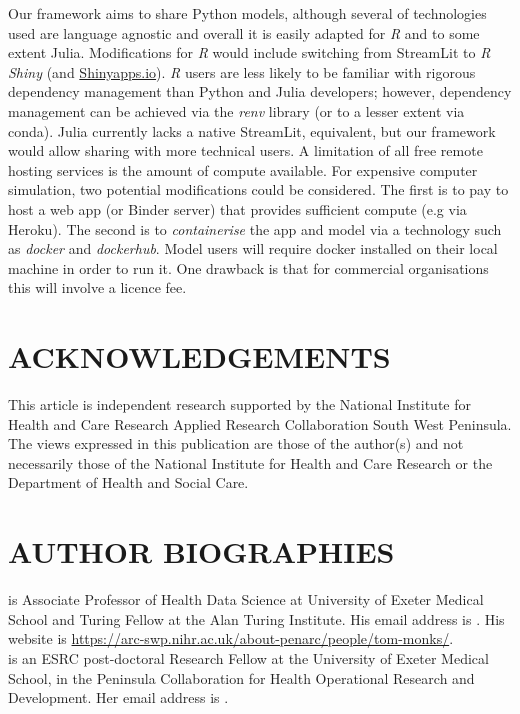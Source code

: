 \documentclass{swpaperproc}
\theoremstyle{sw}
\begin{document}
Our framework aims to share Python models, although several of technologies used are language agnostic and overall it is easily adapted for \textit{R} and to some extent Julia. Modifications for \textit{R} would include switching from StreamLit to \textit{R Shiny} (and \url{Shinyapps.io}). \textit{R} users are less likely to be familiar with rigorous dependency management than Python and Julia developers; however, dependency management can be achieved via the \textit{renv} library (or to a lesser extent via conda). Julia currently lacks a native StreamLit, equivalent, but our framework would allow sharing with more technical users.  
A limitation of all free remote hosting services is the amount of compute available. For expensive computer simulation, two potential modifications could be considered. The first is to pay to host a web app (or Binder server) that provides sufficient compute (e.g via Heroku). The second is to \textit{containerise} the app and model via a technology such as \textit{docker} and \textit{dockerhub}.  Model users will require docker installed on their local machine in order to run it.  One drawback is that for commercial organisations this will involve a licence fee.

\section*{ACKNOWLEDGEMENTS}
This article is independent research supported by the National Institute for Health and Care Research Applied Research Collaboration South West Peninsula. The views expressed in this publication are those of the author(s) and not necessarily those of the National Institute for Health and Care Research or the Department of Health and Social Care.




\section*{AUTHOR BIOGRAPHIES}

 is Associate Professor of Health Data Science at University of Exeter Medical School and Turing Fellow at the Alan Turing Institute. His email address is . His website is \url{https://arc-swp.nihr.ac.uk/about-penarc/people/tom-monks/}. \\


 is an ESRC post-doctoral Research Fellow at the University of Exeter Medical School, in the Peninsula Collaboration for Health Operational Research and Development. Her email address is .\\
\end{document}

